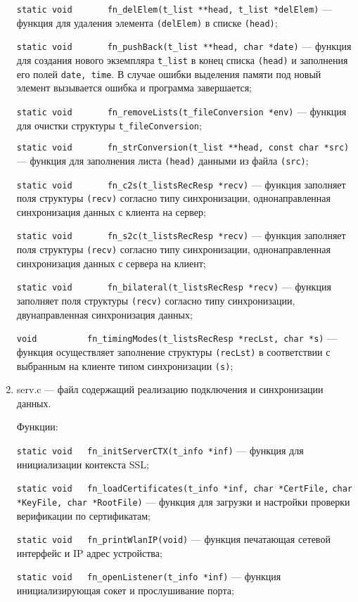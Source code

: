 \begin{enumerate}
	\verb|static void		fn_delElem(t_list **head, t_list *delElem)| --- функция для удаления элемента \verb|(delElem)| в списке \verb|(head)|;
	
	\verb|static void		fn_pushBack(t_list **head, char *date)| --- функция для создания нового экземпляра \verb|t_list| в конец списка \verb|(head)| и заполнения его полей \verb|date, time|. В случае ошибки выделения памяти под новый элемент вызывается ошибка и программа завершается;
	
	\verb|static void		fn_removeLists(t_fileConversion *env)| --- функция для очистки структуры \verb|t_fileConversion|;
	
	\verb|static void		fn_strConversion(t_list **head, const char *src)| --- функция для заполнения листа \verb|(head)| данными из файла \verb|(src)|;
	
	\verb|static void		fn_c2s(t_listsRecResp *recv)| --- функция заполняет поля структуры \verb|(recv)| согласно типу синхронизации, однонаправленная синхронизация данных с клиента на сервер;
	
	\verb|static void		fn_s2c(t_listsRecResp *recv)| --- функция заполняет поля структуры \verb|(recv)| согласно типу синхронизации, однонаправленная синхронизация данных с сервера на клиент; 
	
	\verb|static void		fn_bilateral(t_listsRecResp *recv)| --- функция заполняет поля структуры \verb|(recv)| согласно типу синхронизации, двунаправленная синхронизация данных;
	
	\verb|void			fn_timingModes(t_listsRecResp *recLst, char *s)| --- функция осуществляет заполнение структуры \verb|(recLst)| в соответствии с выбранным на клиенте типом синхронизации \verb|(s)|;
	
	\item serv.c --- файл содержащий реализацию подключения и синхронизации данных.
	
	Функции:
	
	\verb|static void	fn_initServerCTX(t_info *inf)| --- функция для инициализации контекста SSL;
	
	\verb|static void	fn_loadCertificates(t_info *inf, char *CertFile,|
	\verb|char *KeyFile, char *RootFile)| --- функция для загрузки и настройки проверки верификации по сертификатам;
	
	\verb|static void	fn_printWlanIP(void)| --- функция печатающая сетевой интерфейс и IP адрес устройства;
	
	\verb|static void	fn_openListener(t_info *inf)| --- функция инициализирующая сокет и прослушивание порта;
	

\end{enumerate}
